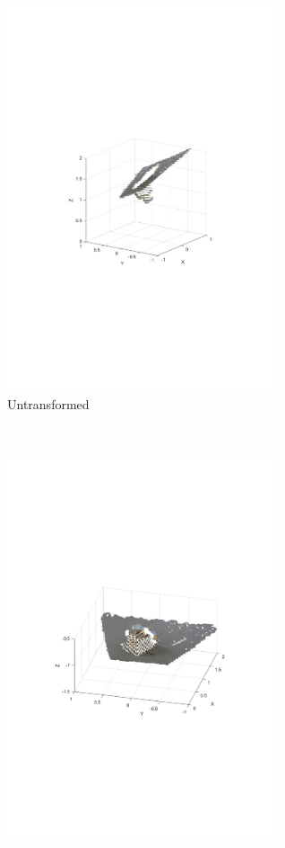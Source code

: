 \documentclass[12pt,a4paper]{article}
\begin{document}
\begin{figure}[h]
  \begin{subfigure}[t]{0.5\textwidth}
  \centering
    \includegraphics[width=80mm, trim = 0 300 120 10, clip]{pc_investigation/MATLAB_na.pdf}
    \caption{Untransformed}
  \end{subfigure}%
  ~
  \begin{subfigure}[t]{0.5\textwidth}
  \centering
    \includegraphics[width=80mm, trim = 0 300 120 10, clip]{pc_investigation/MATLAB_a.pdf}

\end{subfigure}
\end{figure}
\end{document}
